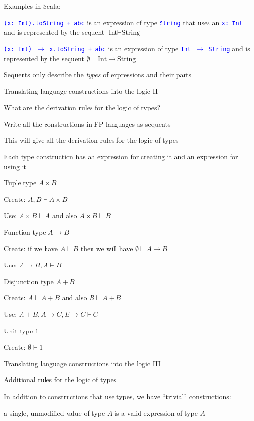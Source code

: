 Examples in Scala:

\texttt{\textcolor{blue}{\footnotesize{}(x:\ Int).toString + \textquotedbl abc\textquotedbl}}
is an expression of type \texttt{\textcolor{blue}{\footnotesize{}String}}
that uses an \texttt{\textcolor{blue}{\footnotesize{}x:\ Int}} and
is represented by the sequent $\text{Int}\vdash\text{String}$

\texttt{\textcolor{blue}{\footnotesize{}(x:\ Int) $\rightarrow$
x.toString + \textquotedbl abc\textquotedbl}} is an expression
of type \texttt{\textcolor{blue}{\footnotesize{}Int $\rightarrow$
String}} and is represented by the sequent $\emptyset\vdash\text{Int}\rightarrow\text{String}$

Sequents only describe the \emph{types} of expressions and their parts

Translating language constructions into the logic II

What are the derivation rules for the logic of types?

Write all the constructions in FP languages as sequents

This will give all the derivation rules for the logic of types

Each type construction has an expression for creating it and an expression
for using it

Tuple type $A\times B$

Create: $A,B\vdash A\times B$ 

Use: $A\times B\vdash A$ and also $A\times B\vdash B$

Function type $A\rightarrow B$

Create: if we have $A\vdash B$ then we will have $\emptyset\vdash A\rightarrow B$ 

Use: $A\rightarrow B,A\vdash B$

Disjunction type $A+B$

Create: $A\vdash A+B$ and also $B\vdash A+B$

Use: $A+B,A\rightarrow C,B\rightarrow C\vdash C$

Unit type $1$

Create: $\emptyset\vdash1$

Translating language constructions into the logic III

Additional rules for the logic of types

In addition to constructions that use types, we have ``trivial''
constructions:

a single, unmodified value of type $A$ is a valid expression of type
$A$

